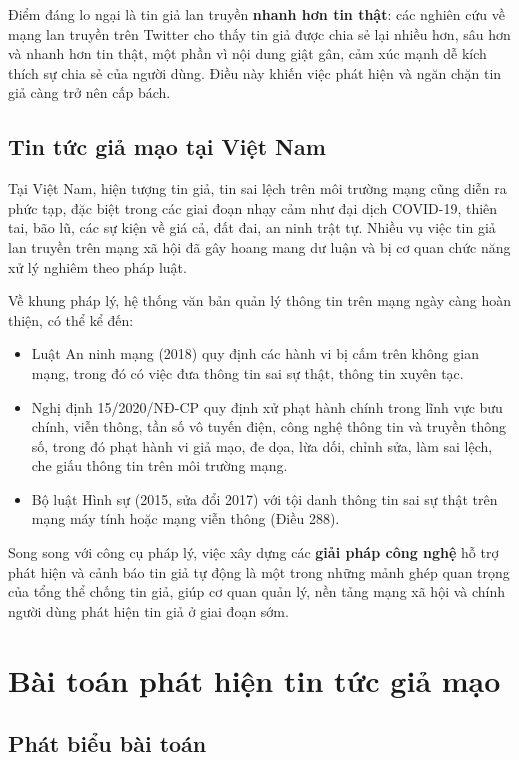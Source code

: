Điểm đáng lo ngại là tin giả lan truyền \textbf{nhanh hơn tin thật}: các nghiên cứu về mạng lan truyền trên Twitter cho thấy tin giả được chia sẻ lại nhiều hơn, sâu hơn và nhanh hơn tin thật, một phần vì nội dung giật gân, cảm xúc mạnh dễ kích thích sự chia sẻ của người dùng. Điều này khiến việc phát hiện và ngăn chặn tin giả càng trở nên cấp bách.

\subsection{Tin tức giả mạo tại Việt Nam}

Tại Việt Nam, hiện tượng tin giả, tin sai lệch trên môi trường mạng cũng diễn ra phức tạp, đặc biệt trong các giai đoạn nhạy cảm như đại dịch COVID-19, thiên tai, bão lũ, các sự kiện về giá cả, đất đai, an ninh trật tự. Nhiều vụ việc tin giả lan truyền trên mạng xã hội đã gây hoang mang dư luận và bị cơ quan chức năng xử lý nghiêm theo pháp luật.

Về khung pháp lý, hệ thống văn bản quản lý thông tin trên mạng ngày càng hoàn thiện, có thể kể đến:

\begin{itemize}
    \item Luật An ninh mạng (2018) quy định các hành vi bị cấm trên không gian mạng, trong đó có việc đưa thông tin sai sự thật, thông tin xuyên tạc.
    \item Nghị định 15/2020/NĐ-CP quy định xử phạt hành chính trong lĩnh vực bưu chính, viễn thông, tần số vô tuyến điện, công nghệ thông tin và truyền thông số, trong đó phạt hành vi giả mạo, đe dọa, lừa dối, chỉnh sửa, làm sai lệch, che giấu thông tin trên môi trường mạng.
    \item Bộ luật Hình sự (2015, sửa đổi 2017) với tội danh thông tin sai sự thật trên mạng máy tính hoặc mạng viễn thông (Điều 288).
\end{itemize}

Song song với công cụ pháp lý, việc xây dựng các \textbf{giải pháp công nghệ} hỗ trợ phát hiện và cảnh báo tin giả tự động là một trong những mảnh ghép quan trọng của tổng thể chống tin giả, giúp cơ quan quản lý, nền tảng mạng xã hội và chính người dùng phát hiện tin giả ở giai đoạn sớm.

\section{Bài toán phát hiện tin tức giả mạo}

\subsection{Phát biểu bài toán}

